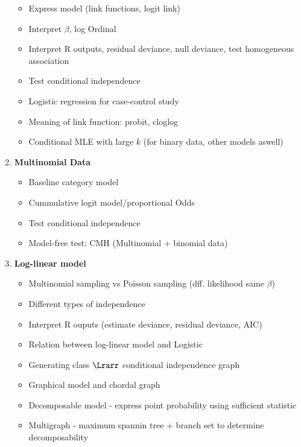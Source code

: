 \begin{enumerate}[leftmargin=*]
    \begin{itemize}
      \item Express model (link functions, logit link)
      \item Interpret $\beta$, log Ordinal
      \item Interpret R outputs, residual deviance, null deviance, test homogeneous association
      \item Test conditional independence
      \item Logistic regression for case-control study
      \item Meaning of link function: probit, cloglog
      \item Conditional MLE with large $k$ (for binary data, other models aswell)
    \end{itemize}
    \par\bigskip
  \item\textbf{Multinomial Data}
    \begin{itemize}
      \item Baseline category model
      \item Cummulative logit model/proportional Odds
      \item Test conditional independence
      \item Model-free test: CMH (Multinomial + binomial data)
    \end{itemize}
    \par\bigskip
  \item\textbf{Log-linear model}
    \begin{itemize}
      \item Multinomial sampling vs Poisson sampling (dff. likelihood same $\beta$)
      \item Different types of independence
      \item Interpret R ouputs (estimate deviance, residual deviance, AIC) 
      \item Relation between log-linear model and Logistic
      \item Generating class $\Lrarr$ conditional independence graph
      \item Graphical model and chordal graph
      \item Decomposable model - express point probability using sufficient statistic
      \item Multigraph - maximum spannin tree + branch set to determine decomposability
    \end{itemize}
\end{enumerate}
